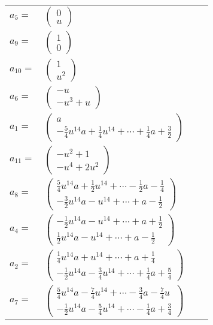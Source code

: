 \documentclass[1p]{elsarticle_modified}
\theoremstyle{definition}
\begin{document}
\begin{tabular}{m{7pt} m{180pt} m{7pt} m{180pt} }
\flushright $a_{5}=$&$\begin{pmatrix}0\\u\end{pmatrix}$ \\
\flushright $a_{9}=$&$\begin{pmatrix}1\\0\end{pmatrix}$ \\
\flushright $a_{10}=$&$\begin{pmatrix}1\\u^2\end{pmatrix}$ \\
\flushright $a_{6}=$&$\begin{pmatrix}- u\\- u^3+u\end{pmatrix}$ \\
\flushright $a_{1}=$&$\begin{pmatrix}a\\-\frac{5}{4} u^{14} a+\frac{1}{4} u^{14}+\cdots+\frac{1}{4} a+\frac{3}{2}\end{pmatrix}$ \\
\flushright $a_{11}=$&$\begin{pmatrix}- u^2+1\\- u^4+2 u^2\end{pmatrix}$ \\
\flushright $a_{8}=$&$\begin{pmatrix}\frac{5}{4} u^{14} a+\frac{1}{2} u^{14}+\cdots-\frac{1}{2} a-\frac{1}{4}\\-\frac{3}{2} u^{14} a- u^{14}+\cdots+a-\frac{1}{2}\end{pmatrix}$ \\
\flushright $a_{4}=$&$\begin{pmatrix}-\frac{1}{2} u^{14} a- u^{14}+\cdots+a+\frac{1}{2}\\\frac{1}{2} u^{14} a- u^{14}+\cdots+a-\frac{1}{2}\end{pmatrix}$ \\
\flushright $a_{2}=$&$\begin{pmatrix}\frac{1}{4} u^{14} a+u^{14}+\cdots+a+\frac{1}{4}\\-\frac{1}{2} u^{14} a-\frac{3}{4} u^{14}+\cdots+\frac{1}{4} a+\frac{5}{4}\end{pmatrix}$ \\
\flushright $a_{7}=$&$\begin{pmatrix}\frac{5}{4} u^{14} a-\frac{7}{4} u^{14}+\cdots-\frac{3}{4} a-\frac{7}{4} u\\-\frac{1}{2} u^{14} a-\frac{5}{4} u^{14}+\cdots-\frac{1}{4} a+\frac{3}{4}\end{pmatrix}$ \\

\end{tabular}
\end{document}

